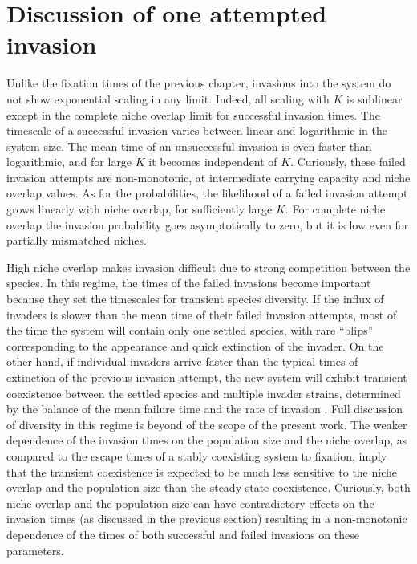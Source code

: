 \section{Discussion of one attempted invasion} \label{DiscussionOfOneAttemptedInvasion}
Unlike the fixation times of the previous chapter, invasions into the system do not show exponential scaling in any limit. 
Indeed, all scaling with $K$ is sublinear except in the complete niche overlap limit for successful invasion times. 
The timescale of a successful invasion varies between linear and logarithmic in the system size. 
The mean time of an unsuccessful invasion is even faster than logarithmic, and for large $K$ it becomes independent of $K$. 
Curiously, these failed invasion attempts are non-monotonic, at intermediate carrying capacity and niche overlap values. %
As for the probabilities, the likelihood of a failed invasion attempt grows linearly with niche overlap, for sufficiently large $K$. 
For complete niche overlap the invasion probability goes asymptotically to zero, but it is low even for partially mismatched niches. 

High niche overlap makes invasion difficult due to strong competition between the species. 
In this regime, the times of the failed invasions become important because they set the timescales for transient species diversity. 
If the influx of invaders is slower than the mean time of their failed invasion attempts, most of the time the system will contain only one settled species, with rare ``blips'' corresponding to the appearance and quick extinction of the invader. 
On the other hand, if individual invaders arrive faster than the typical times of extinction of the previous invasion attempt, the new system will exhibit transient coexistence between the settled species and multiple invader strains, determined by the balance of the mean failure time and the rate of invasion \cite{Dias1996,Chesson2000,Hubbell2001}. 
Full discussion of diversity in this regime is beyond of the scope of the present work. %
The weaker dependence of the invasion times on the population size and the niche overlap, as compared to the escape times of a stably coexisting system to fixation, imply that the transient coexistence is expected to be much less sensitive to the niche overlap and the population size than the steady state coexistence. 
Curiously, both niche overlap and the population size can have contradictory effects on the invasion times (as discussed in the previous section) resulting in a non-monotonic dependence of the times of both successful and failed invasions on these parameters. 

